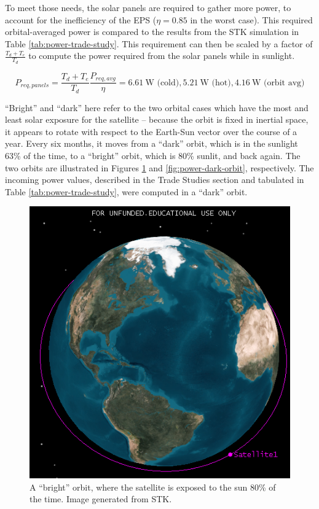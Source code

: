 \documentclass[12pt]{article}
\begin{document}
To meet those needs, the solar panels are required to gather more power, to account for the inefficiency of the EPS ($\eta = 0.85$ in the worst case\cite[p.~9]{EPS-manual}).  This required orbital-averaged power is compared to the results from the STK simulation in Table \ref{tab:power-trade-study}.  This requirement can then be scaled by a factor of $\frac{T_d + T_e}{T_d}$ to compute the power required from the solar panels while in sunlight.

\begin{equation}
P_{req,panels} = \frac{T_d + T_e}{T_d}\frac{P_{req,avg}}{\eta} = 6.61 \ \text{W (cold)}, 5.21 \ \text{W (hot)}, 4.16 \ \text{W (orbit avg)}
\label{eq:power-required-panels}
\end{equation}

``Bright'' and ``dark'' here refer to the two orbital cases which have the most and least solar exposure for the satellite – because the orbit is fixed in inertial space, it appears to rotate with respect to the Earth-Sun vector over the course of a year.  Every six months, it moves from a ``dark'' orbit, which is in the sunlight 63\% of the time, to a ``bright'' orbit, which is 80\% sunlit, and back again.  The two orbits are illustrated in Figures \ref{fig:power-bright-orbit} and \ref{fig:power-dark-orbit}, respectively.  The incoming power values, described in the Trade Studies section and tabulated in Table \ref{tab:power-trade-study}, were computed in a ``dark'' orbit.

\begin{figure}[ht]%
\centering
\includegraphics{images/power-bright-orbit}%
\caption{A ``bright'' orbit, where the satellite is exposed to the sun 80\% of the time.  Image generated from STK.}%
\label{fig:power-bright-orbit}%
\end{figure}
\end{document}
